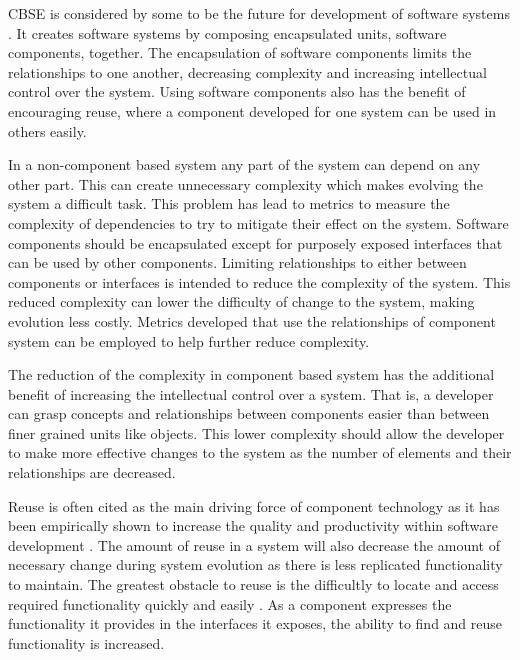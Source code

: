 CBSE is considered by some to be the future for development of software systems \citep{Szyperski2002}.
It creates software systems by composing encapsulated units, software components, together.
The encapsulation of software components limits the relationships to one another, decreasing complexity and increasing intellectual control over the system.
Using software components also has the benefit of encouraging reuse, where a component developed for one system can be used in others easily.

In a non-component based system any part of the system can depend on any other part.
This can create unnecessary complexity which makes evolving the system a difficult task.
This problem has lead to metrics \citep{martin2003} to measure the complexity of dependencies to try to mitigate their effect on the system.
Software components should be encapsulated except for purposely exposed interfaces that can be used by other components.
Limiting relationships to either between components or interfaces is intended to reduce the complexity of the system.
This reduced complexity can lower the difficulty of change to the system, making evolution less costly.
Metrics \citep{Chen2011} developed that use the relationships of component system can be employed to help further reduce complexity.

The reduction of the complexity in component based system has the additional benefit of increasing the intellectual control over a system.
That is, a developer can grasp concepts and relationships between components easier than between finer grained units like objects.
This lower complexity should allow the developer to make more effective changes to the system 
as the number of elements and their relationships are decreased.

Reuse is often cited as the main driving force of component technology as it has been empirically shown to increase the quality and productivity within software development \citep{hallsteinsen_experiences_1997}.
The amount of reuse in a system will also decrease the amount of necessary change during system evolution as there is less replicated functionality to maintain.
The greatest obstacle to reuse is the difficultly to locate and access required functionality quickly and easily \cite{Ye2001}.
As a component expresses the functionality it provides in the interfaces it exposes, the ability to find and reuse functionality is increased.

